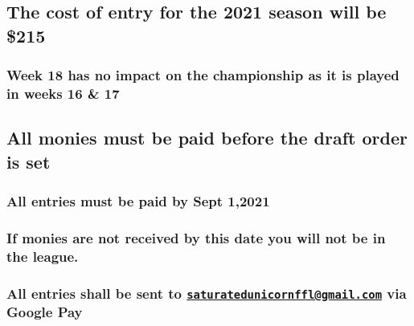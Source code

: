 \documentclass[
]{book}
\begin{document}
\hypertarget{the-cost-of-entry-for-the-2021-season-will-be-215}{%
\subsection{The cost of entry for the 2021 season will be \$215}\label{the-cost-of-entry-for-the-2021-season-will-be-215}}

\hypertarget{week-18-has-no-impact-on-the-championship-as-it-is-played-in-weeks-16-17}{%
\subsubsection{Week 18 has no impact on the championship as it is played in weeks 16 \& 17}\label{week-18-has-no-impact-on-the-championship-as-it-is-played-in-weeks-16-17}}

\hypertarget{all-monies-must-be-paid-before-the-draft-order-is-set}{%
\subsection{All monies must be paid before the draft order is set}\label{all-monies-must-be-paid-before-the-draft-order-is-set}}

\hypertarget{all-entries-must-be-paid-by-sept-12021}{%
\subsubsection{All entries must be paid by Sept 1,2021}\label{all-entries-must-be-paid-by-sept-12021}}

\hypertarget{if-monies-are-not-received-by-this-date-you-will-not-be-in-the-league.}{%
\subsubsection{If monies are not received by this date you will not be in the league.}\label{if-monies-are-not-received-by-this-date-you-will-not-be-in-the-league.}}

\hypertarget{all-entries-shall-be-sent-to-saturatedunicornfflgmail.com-via-google-pay}{%
\subsubsection{\texorpdfstring{All entries shall be sent to \href{mailto:saturatedunicornffl@gmail.com}{\nolinkurl{saturatedunicornffl@gmail.com}} via Google Pay}{All entries shall be sent to saturatedunicornffl@gmail.com via Google Pay}}\label{all-entries-shall-be-sent-to-saturatedunicornfflgmail.com-via-google-pay}}
\end{document}
